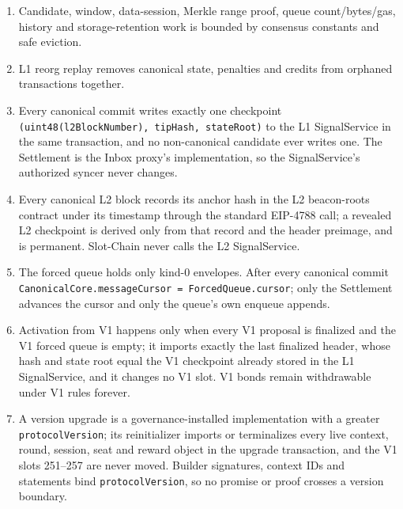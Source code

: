 \documentclass[a4paper,11pt]{article}
\newcommand{\code}[1]{\nolinkurl{#1}}
\begin{document}
{\begin{enumerate}
\item Candidate, window, data-session, Merkle range proof, queue
count/bytes/gas, history and storage-retention work is bounded by consensus
constants and safe eviction.
\item L1 reorg replay removes canonical state, penalties and credits from
orphaned transactions together.
\item Every canonical commit writes exactly one checkpoint
\code{(uint48(l2BlockNumber), tipHash, stateRoot)} to the L1 SignalService in
the same transaction, and no non-canonical candidate ever writes one.  The
Settlement is the Inbox proxy's implementation, so the SignalService's
authorized syncer never changes.
\item Every canonical L2 block records its anchor hash in the L2 beacon-roots
contract under its timestamp through the standard EIP-4788 call; a revealed
L2 checkpoint is derived only from that record and the header preimage, and
is permanent.  Slot-Chain never calls the L2 SignalService.
\item The forced queue holds only kind-0 envelopes.  After every canonical
commit \code{CanonicalCore.messageCursor = ForcedQueue.cursor}; only the
Settlement advances the cursor and only the queue's own enqueue appends.
\item Activation from V1 happens only when every V1 proposal is finalized and
the V1 forced queue is empty; it imports exactly the last finalized header,
whose hash and state root equal the V1 checkpoint already stored in the L1
SignalService, and it changes no V1 slot.  V1 bonds remain withdrawable under
V1 rules forever.
\item A version upgrade is a governance-installed implementation with a
greater \code{protocolVersion}; its reinitializer imports or terminalizes
every live context, round, session, seat and reward object in the upgrade
transaction, and the V1 slots 251--257 are never moved.  Builder signatures,
context IDs and statements bind \code{protocolVersion}, so no promise or proof
crosses a version boundary.
\end{enumerate}
}
\end{document}
